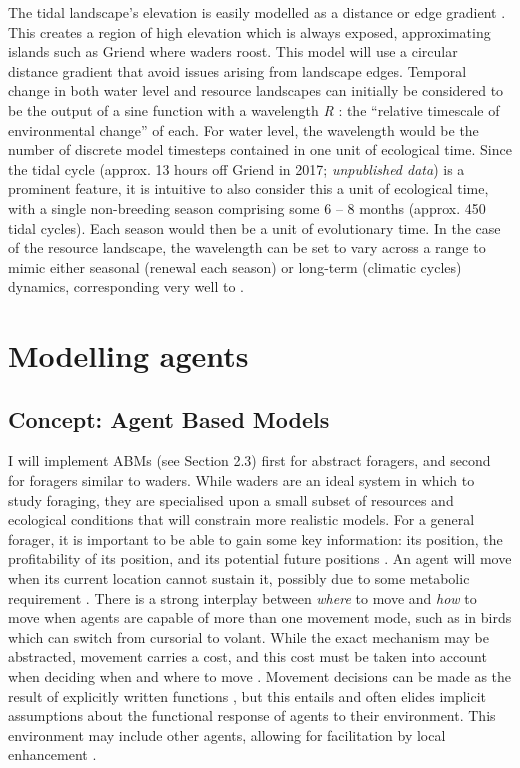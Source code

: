 The tidal landscape's elevation is easily modelled as a distance or edge
gradient \citep{etherington2015}. This creates a region of high
elevation which is always exposed, approximating islands such as Griend
where waders roost. This model will use a circular distance gradient
that avoid issues arising from landscape edges. Temporal change in both
water level and resource landscapes can initially be considered to be
the output of a sine function with a wavelength \emph{R} \citep[as
in][]{botero2015}: the ``relative timescale of environmental change'' of
each. For water level, the wavelength would be the number of discrete
model timesteps contained in one unit of ecological time. Since the
tidal cycle (approx. 13 hours off Griend in 2017; \emph{unpublished
data}) is a prominent feature, it is intuitive to also consider this a
unit of ecological time, with a single non-breeding season comprising
some 6 -- 8 months (approx. 450 tidal cycles). Each season would then be
a unit of evolutionary time. In the case of the resource landscape, the
wavelength can be set to vary across a range to mimic either seasonal
(renewal each season) or long-term (climatic cycles) dynamics,
corresponding very well to \citet{botero2015}.

\section{Modelling agents}

\subsection{Concept: Agent Based Models}

I will implement ABMs (see Section 2.3) first for abstract foragers, and
second for foragers similar to waders. While waders are an ideal system
in which to study foraging, they are specialised upon a small subset of
resources and ecological conditions that will constrain more realistic
models. For a general forager, it is important to be able to gain some
key information: its position, the profitability of its position, and
its potential future positions \citep[\emph{why} and \emph{where} to
move;][]{nathan2008a}. An agent will move when its current location
cannot sustain it, possibly due to some metabolic requirement
\citep{barraquand2008}. There is a strong interplay between \emph{where}
to move and \emph{how} to move when agents are capable of more than one
movement mode, such as in birds which can switch from cursorial to
volant. While the exact mechanism may be abstracted, movement carries a
cost, and this cost must be taken into account when deciding when and
where to move \citep{charnov1976a}. Movement decisions can be made as
the result of explicitly written functions \citep[e.g.][]{getz2015}, but
this entails and often elides implicit assumptions about the functional
response of agents to their environment. This environment may include
other agents, allowing for facilitation by local enhancement
\citep{beauchamp2013}.

